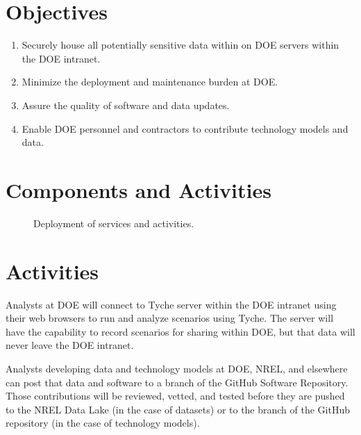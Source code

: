 \documentclass[letterpaper,10pt,english]{sphinxmanual}
\begin{document}
\section{Objectives}
\label{\detokenize{deployment:objectives}}\begin{enumerate}
\def\theenumi{\arabic{enumi}}
\def\labelenumi{\theenumi .}
\makeatletter\def\p@enumii{\p@enumi \theenumi .}\makeatother
\item {} 
Securely house all potentially sensitive data within on DOE servers
within the DOE intranet.

\item {} 
Minimize the deployment and maintenance burden at DOE.

\item {} 
Assure the quality of software and data updates.

\item {} 
Enable DOE personnel and contractors to contribute technology models
and data.

\end{enumerate}


\section{Components and Activities}
\label{\detokenize{deployment:components-and-activities}}
\begin{figure}[htbp]
\centering
\capstart

\noindent{}
\caption{Deployment of services and activities.}\label{\detokenize{deployment:fig-deployment}}\end{figure}


\section{Activities}
\label{\detokenize{deployment:activities}}
Analysts at DOE will connect to Tyche server within the DOE intranet
using their web browsers to run and analyze scenarios using Tyche. The
server will have the capability to record scenarios for sharing within
DOE, but that data will never leave the DOE intranet.

Analysts developing data and technology models at DOE, NREL, and
elsewhere can post that data and software to a branch of the GitHub
Software Repository. Those contributions will be reviewed, vetted, and
tested before they are pushed to the NREL Data Lake (in the case of
datasets) or to the  branch of the GitHub repository (in
the case of technology models).
\end{document}
